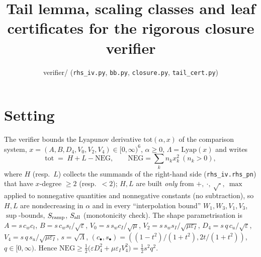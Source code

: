 \documentclass[11pt]{article}
\theoremstyle{definition}
\newcommand{\Ly}{\Lambda}
\newcommand{\tot}{\mathrm{tot}}
\begin{document}
\title{Tail lemma, scaling classes and leaf certificates for the rigorous closure verifier}
\author{verifier/ (\texttt{rhs\_iv.py}, \texttt{bb.py}, \texttt{closure.py}, \texttt{tail\_cert.py})}
\date{}
\maketitle

\section{Setting}
The verifier bounds the Lyapunov derivative $\tot(\alpha,x)$ of the comparison system, $x=(A,B,D_4,V_0,V_2,V_4)\in[0,\infty)^6$, $\alpha\ge0$,
$\Ly=\mathrm{Lyap}(x)$ and writes
\[
 \tot \;=\; H+L-\mathrm{NEG},\qquad \mathrm{NEG}=\sum_k n_k x_k^2 \ (n_k>0),
\]
where $H$ (resp.\ $L$) collects the summands of the right-hand side (\texttt{rhs\_iv.rhs\_pn}) that have $x$-degree $\ge 2$ (resp.\ $<2$);
$H,L$ are built \emph{only} from $+,\ \cdot,\ \sqrt{\cdot},\ \max$ applied to nonnegative quantities and nonnegative constants (no subtraction),
so $H,L$ are nondecreasing in $\alpha$ and in every ``interpolation bound'' $W_1,W_3,V_1,V_3$, $\sup$-bounds, $S_{\rm ramp}$, $S_{\rm all}$ (monotonicity check).
The shape parametrisation is $A=s\,c_w c_t$, $B=s\,c_w s_t/\sqrt\varepsilon$, $V_0=s\,s_w c_I/\sqrt\mu$, $V_2=s\,s_w s_I/\sqrt{\mu\varepsilon_I}$,
$D_4=s\,q\,c_u/\sqrt\varepsilon$, $V_4=s\,q\,s_u/\sqrt{\mu\varepsilon_I}$, $s=\sqrt{\Ly}$, $(c_\bullet,s_\bullet)=((1-t^2)/(1+t^2),2t/(1+t^2))$, $q\in[0,\infty)$.
Hence $\mathrm{NEG}\ge \tfrac12\bigl(\varepsilon D_4^2+\mu\varepsilon_I V_4^2\bigr)=\tfrac12 s^2q^2$.
\end{document}
